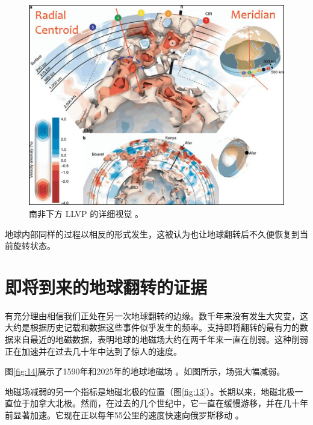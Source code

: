 \documentclass[10pt,twocolumn,letterpaper]{article}
\begin{document}
\begin{figure}[t]
\begin{center}
   \includegraphics[width=1\linewidth]{llvp.jpg}
\end{center}
   \caption{南非下方 LLVP 的详细视觉 \cite{28}。}
\label{fig:12}
\label{fig:onecol}
\end{figure}

地球内部同样的过程以相反的形式发生，这被认为也让地球翻转后不久便恢复到当前旋转状态。

\section{即将到来的地球翻转的证据}

有充分理由相信我们正处在另一次地球翻转的边缘。数千年来没有发生大灾变，这大约是根据历史记载和数据这些事件似乎发生的频率。支持即将翻转的最有力的数据来自最近的地磁数据，表明地球的地磁场大约在两千年来一直在削弱。这种削弱正在加速并在过去几十年中达到了惊人的速度。

图\ref{fig:14}展示了1590年和2025年的地球地磁场 \cite{125,126}。如图所示，场强大幅减弱。

地磁场减弱的另一个指标是地磁北极的位置（图\ref{fig:13}）。长期以来，地磁北极一直位于加拿大北极。然而，在过去的几个世纪中，它一直在缓慢游移，并在几十年前显著加速。它现在正以每年55公里的速度快速向俄罗斯移动 \cite{124}。
\end{document}
